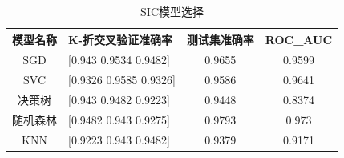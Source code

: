 \documentclass[12pt, a4paper, oneside]{ctexart}
\numberwithin{equation}{section}  %
\begin{document}
\begin{table}[H] %
    \centering %
\begin{tabular}{clcc}
    \toprule
\textbf{模型名称} & \textbf{K-折交叉验证准确率}        & \textbf{测试集准确率} & \textbf{ROC\_AUC} \\
    \midrule
SGD           & {[}0.943  0.9534 0.9482{]} & 0.9655          & 0.9599            \\
SVC           & {[}0.9326 0.9585 0.9326{]} & 0.9586          & 0.9641            \\
决策树           & {[}0.943  0.9482 0.9223{]} & 0.9448          & 0.8374            \\
随机森林          & {[}0.9482 0.943  0.9275{]} & 0.9793          & 0.973             \\
KNN           & {[}0.9223 0.943  0.9482{]} & 0.9379          & 0.9171           \\
    \bottomrule
\end{tabular}
    \caption{SIC模型选择}
    \label{table-sic}
\end{table}
\end{document}
